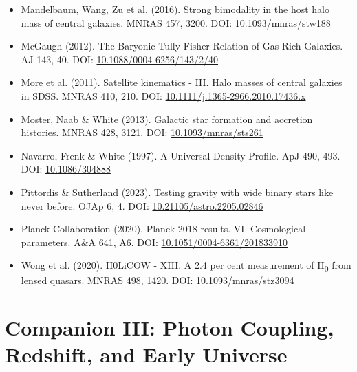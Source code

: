 \documentclass[11pt,a4paper]{article}
\begin{document}
\begin{itemize}
  \item Mandelbaum, Wang, Zu et al. (2016). Strong bimodality in the host halo mass of central galaxies. MNRAS 457, 3200. DOI: \href{https://doi.org/10.1093/mnras/stw188}{10.1093/\allowbreak{}mnras/\allowbreak{}stw188}
  \item McGaugh (2012). The Baryonic Tully-Fisher Relation of Gas-Rich Galaxies. AJ 143, 40. DOI: \href{https://doi.org/10.1088/0004-6256/143/2/40}{10.1088/\allowbreak{}0004-6256/\allowbreak{}143/\allowbreak{}2/\allowbreak{}40}
  \item More et al. (2011). Satellite kinematics  -  III. Halo masses of central galaxies in SDSS. MNRAS 410, 210. DOI: \href{https://doi.org/10.1111/j.1365-2966.2010.17436.x}{10.1111/\allowbreak{}j.1365-2966.2010.17436.x}
  \item Moster, Naab \& White (2013). Galactic star formation and accretion histories. MNRAS 428, 3121. DOI: \href{https://doi.org/10.1093/mnras/sts261}{10.1093/\allowbreak{}mnras/\allowbreak{}sts261}
  \item Navarro, Frenk \& White (1997). A Universal Density Profile. ApJ 490, 493. DOI: \href{https://doi.org/10.1086/304888}{10.1086/\allowbreak{}304888}
  \item Pittordis \& Sutherland (2023). Testing gravity with wide binary stars like never before. OJAp 6, 4. DOI: \href{https://doi.org/10.21105/astro.2205.02846}{10.21105/\allowbreak{}astro.2205.02846}
  \item Planck Collaboration (2020). Planck 2018 results. VI. Cosmological parameters. A\&A 641, A6. DOI: \href{https://doi.org/10.1051/0004-6361/201833910}{10.1051/\allowbreak{}0004-6361/\allowbreak{}201833910}
  \item Wong et al. (2020). H0LiCOW  -  XIII. A 2.4 per cent measurement of H\textsubscript{0} from lensed quasars. MNRAS 498, 1420. DOI: \href{https://doi.org/10.1093/mnras/stz3094}{10.1093/\allowbreak{}mnras/\allowbreak{}stz3094}
\end{itemize}



\part{Companion III: Photon Coupling, Redshift, and Early Universe}

\begin{abstract}
This companion paper (Part III) explores the coupling between the MTDF stress field and photon propagation. We present the photon-stress coupling parameter $\kappa$ = 0.00102, its structural relation to the early field energy fraction f\textsubscript{kick}, and the resulting achromatic frequency shift mechanism. Empirical motivation comes from Pantheon+ Type Ia supernovae cross-matched to DESI void catalogues, which detect an environment-dependent distance-modulus residual ($\gamma$\textsubscript{env} = +0.013 $\pm$ 0.004, p = 0.003) at low redshift. All extensions are explicitly labelled as hypotheses with stated falsification criteria.
\end{abstract}
\end{document}
